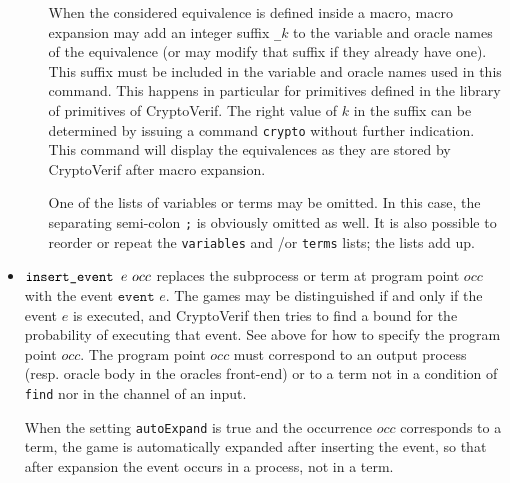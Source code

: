 \documentclass{article}
\begin{document}
\begin{itemize}
\begin{itemize}
\begin{itemize}
\end{itemize}
When the considered equivalence is defined inside a macro,
macro expansion may add an integer suffix \texttt{\_$k$} to the variable
and oracle names of the equivalence (or may modify that suffix if
they already have one). This suffix must be included in
the variable and oracle names used in this command.
This happens in particular for primitives defined in the
library of primitives of CryptoVerif. The right value of $k$ in the
suffix can be determined by issuing a command \texttt{crypto} without
further indication. This command will display the equivalences
as they are stored by CryptoVerif after macro expansion.

One of the lists of variables or terms may be omitted.
In this case, the separating semi-colon \texttt{;} is obviously
omitted as well. It is also possible to reorder or repeat the
\texttt{variables} and /or \texttt{terms} lists; the lists add up.

\end{itemize}


\item $\texttt{insert\string_event }e\ occ$ replaces the subprocess or term at
program point $occ$ with the event $\texttt{event }e$. The games may
be distinguished if and only if the event $e$ is executed, and CryptoVerif
then tries to find a bound for the probability of executing that event.
See above for how to specify the program point $occ$.
The program point $occ$ must correspond to an output process
(resp. oracle body in the oracles front-end) or to a term not in a
condition of {\tt find} nor in the channel of an input.

When the setting {\tt autoExpand} is true and the occurrence $occ$
corresponds to a term, the game is automatically expanded after
inserting the event, so that after expansion the event occurs in a
process, not in a term.


\end{itemize}
\end{document}
